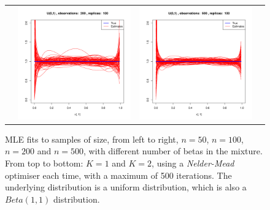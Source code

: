 \begin{figure}[h]
\begin{tabular}{cccc}
	&
	\includegraphics[width=\textwidth/4]{../img/uniform/tilted/K2/densities/n200_R100.pdf}
	&
	\includegraphics[width=\textwidth/4]{../img/uniform/tilted/K2/densities/n500_R100.pdf}\\
	
\end{tabular}
\caption{MLE fits to samples of size, from left to right, $n=50$, $n=100$, $n=200$ and $n=500$, with different number of betas in the mixture. From top to bottom: $K=1$ and $K=2$, using a \textit{Nelder-Mead} optimiser each time, with a maximum of 500 iterations. The underlying distribution is a uniform distribution, which is also a $Beta(1,1)$ distribution.}
\label{fig:uniform_fits}
\end{figure}





